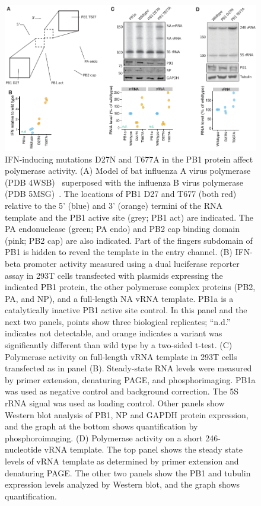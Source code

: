 \documentclass[]{asm-article}
\begin{document}
\begin{figure}

\centerline{\includegraphics[width=\textwidth]{figures/PB1_figure/PB1_figure.pdf}}
\caption{
IFN-inducing mutations D27N and T677A in the PB1 protein affect polymerase activity. 
(A) Model of bat influenza A virus polymerase (PDB 4WSB)~\cite{reich2014structural} superposed with the influenza B virus polymerase (PDB 5MSG)~\cite{reich2017vitro}.
The locations of PB1 D27 and T677 (both red) relative to the 5' (blue) and 3' (orange) termini of the RNA template and the PB1 active site (grey; PB1 act) are indicated.
The PA endonuclease (green; PA endo) and PB2 cap binding domain (pink; PB2 cap) are also indicated. 
Part of the fingers subdomain of PB1 is hidden to reveal the template in the entry channel. 
(B) IFN-beta promoter activity measured using a dual luciferase reporter assay in 293T cells transfected with plasmids expressing the indicated PB1 protein, the other polymerase complex proteins (PB2, PA, and NP), and a full-length NA vRNA template.
PB1a is a catalytically inactive PB1 active site control.
In this panel and the next two panels, points show three biological replicates; ``n.d.'' indicates not detectable, and orange indicates a variant was significantly different than wild type by a two-sided t-test.
(C) Polymerase activity on full-length vRNA template in 293T cells transfected as in panel (B).
Steady-state RNA levels were measured by primer extension, denaturing PAGE, and phosphorimaging. 
PB1a was used as negative control and background correction. 
The 5S rRNA signal was used as loading control. 
Other panels show Western blot analysis of PB1, NP and GAPDH protein expression, and the graph at the bottom shows quantification by phosphoroimaging. 
(D) Polymerase activity on a short 246-nucleotide vRNA template. 
The top panel shows the steady state levels of vRNA template as determined by primer extension and denaturing PAGE. 
The other two panels show the PB1 and tubulin expression levels analyzed by Western blot, and the graph shows quantification.
}
\label{fig:PB1}

\end{figure}
\end{document}
